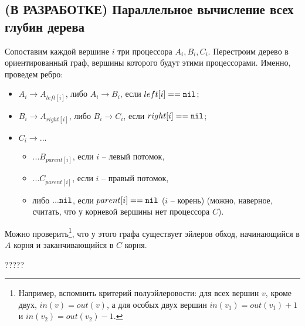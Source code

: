 \subsection{(В РАЗРАБОТКЕ) Параллельное вычисление всех глубин дерева}

 Сопоставим каждой вершине $i$ три процессора $A_i, B_i, C_i$. Перестроим дерево в ориентированный граф, вершины которого будут этими процессорами. Именно, проведем ребро:
\begin{itemize}
\item $A_i \rightarrow A_{left[i]}$, либо $A_i \rightarrow B_i$, если $left[i] == \mathtt{nil}$;
\item $B_i \rightarrow A_{right[i]}$, либо $B_i \rightarrow C_i$, если $right[i] == \mathtt{nil}$;
\item $C_i \rightarrow ...$
\begin{itemize}
\item $...B_{parent[i]}$, если $i$ -- левый потомок,
\item $...C_{parent[i]}$, если $i$ -- правый потомок,
\item либо $...\mathtt{nil}$, если $parent[i] == \mathtt{nil}$ ($i$ -- корень) (можно, наверное, считать, что у корневой вершины нет процессора $C$).
\end{itemize}
\end{itemize}

Можно проверить\footnote{Например, вспомнить критерий полуэйлеровости: для всех вершин $v$, кроме двух, $in(v) = out(v)$, а для особых двух вершин $in(v_1) = out(v_1) + 1$ и $in(v_2) = out(v_2) - 1$.}, что у этого графа существует эйлеров обход, начинающийся в $A$ корня и заканчивающийся в $C$ корня.

?????
